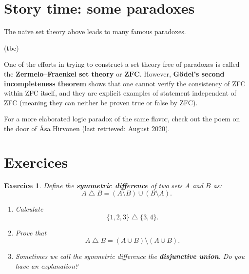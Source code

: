 \documentclass[
	fontsize=10pt, %
	twoside=true, %
	secnumdepth=1, %
	numbers=noenddot, %
]{kaobook}
\newtheorem{exer}{Exercice}[chapter]
\begin{document}
\section{Story time: some paradoxes}
The naïve set theory above leads to many famous paradoxes.

(tbc)

One of the efforts in trying to construct a set theory free of paradoxes is called the \textbf{Zermelo–Fraenkel set theory} or $\textbf{ZFC}$. However, \textbf{Gödel's second incompleteness theorem} shows that one cannot verify the consistency of ZFC within ZFC itself, and they are explicit examples of statement independent of ZFC (meaning they can neither be proven true or false by ZFC).

For a more elaborated logic paradox of the same flavor, check out the poem on the door of Åsa Hirvonen (last retrieved: August 2020).

\section{Exercices}
\begin{exer}
Define the \textbf{symmetric difference} of two sets $A$ and $B$ as:
\begin{equation*}
A\bigtriangleup B=(A\setminus B)\cup(B\setminus A).
\end{equation*}
\begin{enumerate}
	\item Calculate
	\begin{equation*}
	\{1,2,3\}\bigtriangleup \{3,4\}.
	\end{equation*}
	\item Prove that
	\begin{equation*}
	A\bigtriangleup B=(A\cup B)\setminus(A\cup B).
	\end{equation*}
	\item Sometimes we call the symmetric difference the \textbf{disjunctive union}. Do you have an explanation?
\end{enumerate}
\end{exer}
\end{document}
